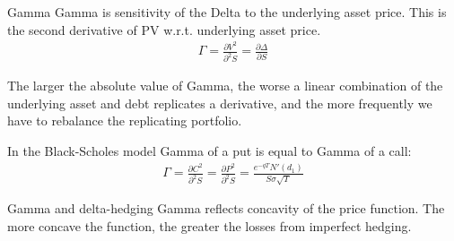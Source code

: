 \documentclass{beamer}
\begin{document}
\begin{frame}{Gamma}
\justify
\alert{Gamma} is sensitivity of the Delta to the underlying asset price. This is the second derivative of PV w.r.t. underlying asset price.
\begin{align*}
\Gamma = \frac{\partial V^2}{\partial^2 S} = \frac{\partial \Delta}{\partial S}
\end{align*}

\justify
The larger the absolute value of Gamma, the worse a linear combination of the underlying asset and debt replicates a derivative, and the more frequently we have to rebalance the replicating portfolio.

\justify
In the Black-Scholes model Gamma of a put is equal to Gamma of a call:
\begin{align*}
\Gamma = \frac{\partial C^2}{\partial^2 S} = \frac{\partial P^2}{\partial^2 S} =
\frac{e^{-qT}N'(d_1)}{S\sigma\sqrt{T}} 
\end{align*} 
\end{frame}



\begin{frame}{Gamma and delta-hedging}
\justify
Gamma reflects concavity of the price function. The more concave the function, the greater the losses from imperfect hedging.

\centering
{}
\end{frame}
\end{document}
